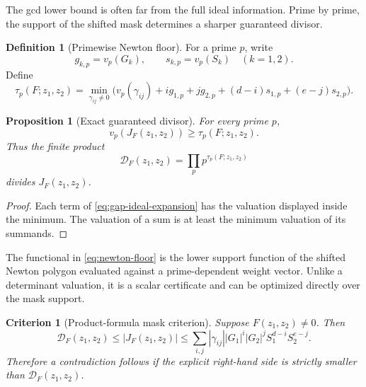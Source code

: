 \documentclass[11pt,oneside]{article}
\newtheorem{proposition}[theorem]{Proposition}
\newtheorem{criterion}[theorem]{Criterion}
\theoremstyle{definition}
\newtheorem{definition}[theorem]{Definition}
\theoremstyle{remark}
\begin{document}
The gcd lower bound is often far from the full ideal information.  Prime by prime, the
support of the shifted mask determines a sharper guaranteed divisor.

\begin{definition}[Primewise Newton floor]
\label{def:newton-floor}
For a prime $p$, write
\[
 g_{k,p}=v_p(G_k),\qquad s_{k,p}=v_p(S_k)\quad(k=1,2).
\]
Define
\begin{equation}
 \tau_p(F;z_1,z_2)
 =\min_{\gamma_{ij}\ne0}
 \bigl(
 v_p(\gamma_{ij})+i g_{1,p}+j g_{2,p}
 +(d-i)s_{1,p}+(e-j)s_{2,p}
 \bigr).
 \label{eq:newton-floor}
\end{equation}
\end{definition}

\begin{proposition}[Exact guaranteed divisor]
\label{prop:guaranteed-divisor}
For every prime $p$,
\begin{equation}
 v_p(J_F(z_1,z_2))\ge\tau_p(F;z_1,z_2).
 \label{eq:vp-guaranteed}
\end{equation}
Thus the finite product
\begin{equation}
 \mathcal D_F(z_1,z_2)=\prod_p p^{\tau_p(F;z_1,z_2)}
 \label{eq:guaranteed-divisor}
\end{equation}
divides $J_F(z_1,z_2)$.
\end{proposition}

\begin{proof}
Each term of \eqref{eq:gap-ideal-expansion} has the valuation displayed inside the minimum.
The valuation of a sum is at least the minimum valuation of its summands.
\end{proof}

The functional in \eqref{eq:newton-floor} is the lower support function of the shifted Newton
polygon evaluated against a prime-dependent weight vector.  Unlike a determinant valuation,
it is a scalar certificate and can be optimized directly over the mask support.

\begin{criterion}[Product-formula mask criterion]
\label{crit:product-formula}
Suppose $F(z_1,z_2)\ne0$.  Then
\begin{equation}
 \mathcal D_F(z_1,z_2)
 \le |J_F(z_1,z_2)|
 \le
 \sum_{i,j}|\gamma_{ij}|
 |G_1|^i|G_2|^jS_1^{d-i}S_2^{e-j}.
 \label{eq:product-formula-sandwich}
\end{equation}
Therefore a contradiction follows if the explicit right-hand side is strictly smaller than
$\mathcal D_F(z_1,z_2)$.
\end{criterion}
\end{document}
